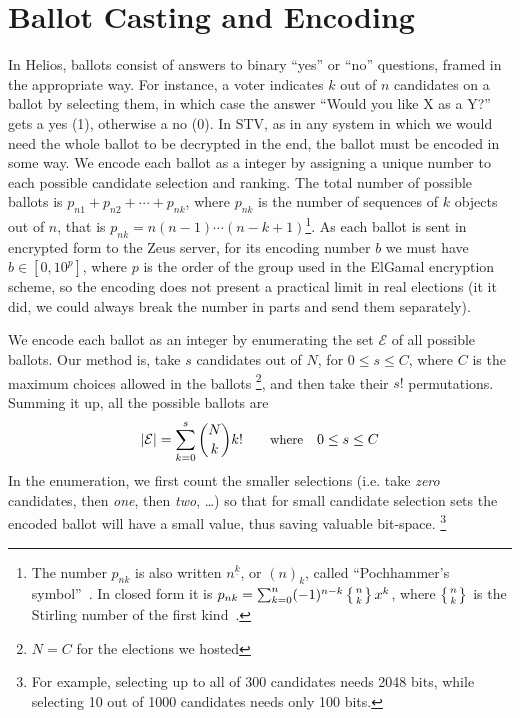 \documentclass[runningheads,a4paper]{llncs}
\begin{document}
\section{Ballot Casting and Encoding}

In Helios, ballots consist of answers to binary ``yes'' or ``no''
questions, framed in the appropriate way. For instance, a voter
indicates $k$ out of $n$ candidates on a ballot by selecting them, in
which case the answer ``Would you like X as a Y?'' gets a yes (1),
otherwise a no (0). In STV, as in any system in which we would need
the whole ballot to be decrypted in the end, the ballot must be
encoded in some way. We encode each ballot as a integer by assigning a
unique number to each possible candidate selection and ranking. The
total number of possible ballots is $p _{n1} + p_{n2} + \cdots + p
_{nk}$, where $p_{nk}$ is the number of sequences of $k$ objects out
of $n$, that is $p_{nk} = n(n - 1)\cdots(n - k + 1)$\footnote{The
  number $p_{nk}$ is also written $n^{\underline{k}}$, or $(n)_k$,
  called ``Pochhammer's symbol''~\cite[p.\ 48]{graham:1994}. In closed
  form it is $p_{nk} = \sum_{k=0}^{n} (-1)^{n-k}\left\{n \atop
    k\right\}x^k$, where $\left\{n \atop k\right\}$ is the Stirling
  number of the first kind~\cite{weisstein:pochhammer}.}. As each
ballot is sent in encrypted form to the Zeus server, for its encoding
number $b$ we must have $b \in [0, 10^p]$, where $p$ is the order of
the group used in the ElGamal encryption scheme, so the encoding does
not present a practical limit in real elections (it it did, we could
always break the number in parts and send them separately).

We encode each ballot as an integer by enumerating the set
$\mathcal{E}$ of all possible ballots.
Our method is, take $s$ candidates out of $N$,
for $0\leq s \leq C$, where $C$ is the maximum choices allowed
in the ballots \footnote{$N=C$ for the elections we hosted},
and then take their $s!$ permutations.
Summing it up, all the possible ballots are
\begin{equation}
\label{eq:max_encoded}
|\mathcal{E}| = \sum^{s}_{k=0}\binom{N}{k}k! \quad
\hbox{\small where} \quad 0\leq s \leq C
\end{equation}
In the enumeration, we first count the smaller selections
(i.e. take \textit{zero} candidates,
      then \textit{one}, then \textit{two}, \ldots)
so that for small candidate selection sets the encoded
ballot will have a small value, thus saving valuable bit-space.
\footnote{
For example, selecting up to all of 300 candidates needs 2048 bits,
while selecting 10 out of 1000 candidates needs only 100 bits.}
\end{document}
